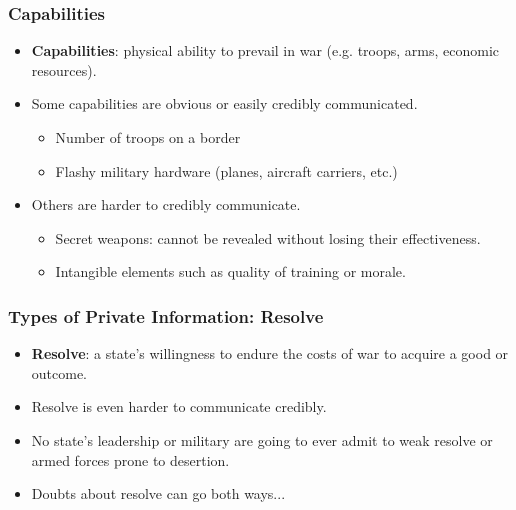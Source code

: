 \documentclass[handout]{beamer}
\begin{document}
\begin{frame} 
	\frametitle{\LARGE{Capabilities}}
	\begin{itemize}
		\item \textbf{Capabilities}: physical ability to prevail in war (e.g. troops, arms, economic resources). \pause
		\item Some capabilities are obvious or easily credibly communicated. \pause
		\begin{itemize}
			\item Number of troops on a border \pause
			\item Flashy military hardware (planes, aircraft carriers, etc.) \pause
		\end{itemize}
		\item Others are harder to credibly communicate. \pause
			\begin{itemize}
			\item Secret weapons: cannot be revealed without losing their effectiveness. \pause
			\item Intangible elements such as quality of training or morale.
		\end{itemize}
	\end{itemize}
\end{frame}

\begin{frame} 
	\frametitle{\LARGE{Types of Private Information: Resolve}}
	\begin{itemize}
		\item \textbf{Resolve}: a state's willingness to endure the costs of war to acquire a good or outcome. \pause 
		\item Resolve is even harder to communicate credibly. \pause
		\item No state's leadership or military are going to ever admit to weak resolve or armed forces prone to desertion. \pause
		\item Doubts about resolve can go both ways...
	\end{itemize}
\end{frame}
\end{document}
